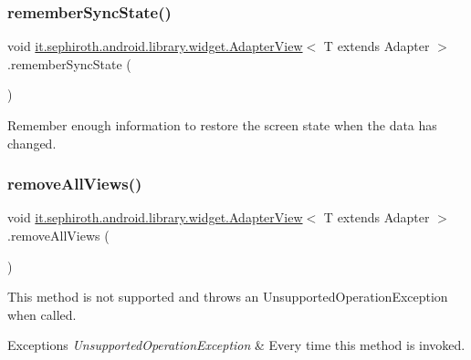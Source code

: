 \subsubsection{\texorpdfstring{remember\+Sync\+State()}{rememberSyncState()}}
{\footnotesize\ttfamily void \hyperlink{classit_1_1sephiroth_1_1android_1_1library_1_1widget_1_1_adapter_view}{it.\+sephiroth.\+android.\+library.\+widget.\+Adapter\+View}$<$ T extends Adapter $>$.remember\+Sync\+State (\begin{DoxyParamCaption}{ }\end{DoxyParamCaption})}

Remember enough information to restore the screen state when the data has changed.  \mbox{\label{classit_1_1sephiroth_1_1android_1_1library_1_1widget_1_1_adapter_view_a8065d24d5039a00638dd99236d5a1762}} 
\subsubsection{\texorpdfstring{remove\+All\+Views()}{removeAllViews()}}
{\footnotesize\ttfamily void \hyperlink{classit_1_1sephiroth_1_1android_1_1library_1_1widget_1_1_adapter_view}{it.\+sephiroth.\+android.\+library.\+widget.\+Adapter\+View}$<$ T extends Adapter $>$.remove\+All\+Views (\begin{DoxyParamCaption}{ }\end{DoxyParamCaption})}

This method is not supported and throws an Unsupported\+Operation\+Exception when called.


\begin{DoxyExceptions}{Exceptions}
{\em Unsupported\+Operation\+Exception} & Every time this method is invoked. \\
\hline
\end{DoxyExceptions}
\mbox{\label{classit_1_1sephiroth_1_1android_1_1library_1_1widget_1_1_adapter_view_a2007337f04dbacb625fccfaa4d96457c}} 
